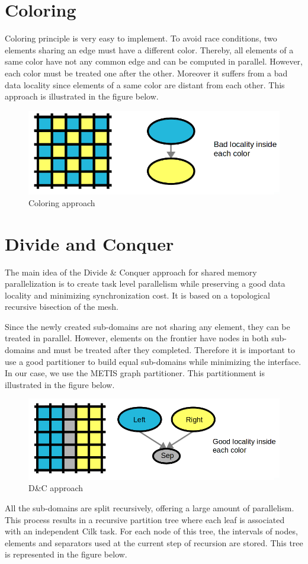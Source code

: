\documentclass{IOS-Book-Article}
\begin{document}
\section{Coloring}
 Coloring principle is very easy to implement. To avoid race conditions, two elements sharing an edge must have a different color.
 Thereby, all elements of a same color have not any common edge and can be computed in parallel.
 However, each color must be treated one after the other. Moreover it suffers from a bad data locality since elements of a same color are distant from each other.
 This approach is illustrated in the figure below.
\begin{figure}[htp]
 \centering
 \label{fig1}
 \includegraphics[scale=0.25]{Coloring_approach.png}
 \caption{Coloring approach}
\end{figure}

\section{Divide and Conquer}

The main idea of the Divide \& Conquer approach for shared memory parallelization is to create task level parallelism while preserving a good data locality and
minimizing synchronization cost. It is based on a topological recursive bisection of the mesh.

Since the newly created sub-domains are not sharing any element, they can be treated in parallel.
However, elements on the frontier have nodes in both sub-domains and must be treated after they completed.
Therefore it is important to use a good partitioner to build equal sub-domains while minimizing the interface. In our case, we use the METIS graph partitioner.
This partitionment is illustrated in the figure below.
\begin{figure}[htp]
 \centering
 \label{fig2}
 \includegraphics[scale=0.25]{DC_approach.png}
 \caption{D\&C approach}
\end{figure}
All the sub-domains are split recursively, offering a large amount of parallelism.
This process results in a recursive partition tree where each leaf is associated with an independent Cilk task.
For each node of this tree, the intervals of nodes, elements and separators used at the current step of recursion are stored.
This tree is represented in the figure below.
\end{document}
